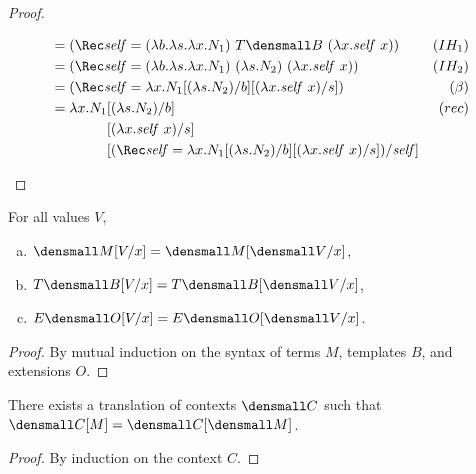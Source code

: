 \begin{proof}
\begin{enumerate}[(a)]
\begin{itemize}
\begin{align*}
        &=
        (\Rec \mathit{self}
        = (\lambda b. \lambda s. \lambda x. N_1)
        ~ T\den{B}
        ~ (\lambda x. \mathit{self} ~ x))
        &(IH_1)
        \\
        &=
        (\Rec \mathit{self}
        = (\lambda b. \lambda s. \lambda x. N_1)
        ~ (\lambda s. N_2)
        ~ (\lambda x. \mathit{self} ~ x))
        &(IH_2)
        \\
        &=
        (\Rec \mathit{self}
        = \lambda x.N_1\subst{b}{(\lambda s.N_2)}\subst{s}{(\lambda x.\mathit{self}~x)})
        &(\beta)
        \\
        &=
        \begin{aligned}[t]
          \lambda x.
          N_1
          &\subst{b}{(\lambda s.N_2)}
          \\
          &\subst{s}{(\lambda x.\mathit{self}~x)}
          \\
          &\subst
          {\mathit{self}}
          {
            (\Rec \mathit{self}
            =
            \lambda x.N_1\subst{b}{(\lambda s.N_2)}\subst{s}{(\lambda x.\mathit{self}~x)})
          }
        \end{aligned}
        &(rec)
      \end{align*}
    \end{itemize}
  \end{enumerate}
\end{proof}

\begin{lemma}[Substitution]
  \label{thm:substitution-translation}
  For all values $V$,
  \begin{enumerate}[(a)]
  \item $\den{M\subst{x}{V}} = \den{M}\subst{x}{\den{V}}$,
  \item $T\den{B\subst{x}{V}} = T\den{B}\subst{x}{\den{V}}$,
  \item $E\den{O\subst{x}{V}} = E\den{O}\subst{x}{\den{V}}$.
  \end{enumerate}
\end{lemma}
\begin{proof}
  By mutual induction on the syntax of terms $M$, templates $B$, and extensions $O$.
\end{proof}

\begin{lemma}[Compositionality]
  \label{thm:compositional-translation}

  There exists a translation of contexts $\den{C}$ such that
  $\den{C[M]} = \den{C}{[\den{M}]}$.
\end{lemma}
\begin{proof}
  By induction on the context $C$.
\end{proof}

